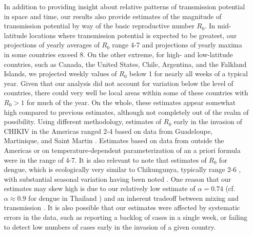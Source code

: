 \documentclass[11pt]{article}
\begin{document}
In addition to providing insight about relative patterns of transmission potential in space and time, our results also provide estimates of the magnitude of transmission potential by way of the basic reproductive number $R_0$. In mid-latitude locations where transmission potential is expected to be greatest, our projections of yearly averages of $R_0$ range 4-7 and projections of yearly maxima in some countries exceed 8. On the other extreme, for high- and low-latitude countries, such as Canada, the United States, Chile, Argentina, and the Falkland Islands, we projected weekly values of $R_0$ below 1 for nearly all weeks of a typical year. Given that our analysis did not account for variation below the level of countries, there could very well be local areas within some of these countries with $R_0>1$ for much of the year. On the whole, these estimates appear somewhat high compared to previous estimates, although not completely out of the realm of possibility. Using different methodology, estimates of $R_0$ early in the invasion of CHIKIV in the Americas ranged 2-4 based on data from Guadeloupe, Martinique, and Saint Martin \cite{Cauchemez2014}. Estimates based on data from outside the Americas \cite{Yakob2013,Robinson2014} or on temperature-dependent parameterization of an a priori formula \cite{Johansson2014} were in the range of 4-7. It is also relevant to note that estimates of $R_0$ for dengue, which is ecologically very similar to Chikungunya, typically range 2-6 \cite{Johansson2011}, with substantial seasonal variation having been noted \cite{Reiner2014}. One reason that our estimates may skew high is due to our relatively low estimate of $\alpha=0.74$ (cf. $\alpha\approx0.9$ for dengue in Thailand \cite{Reich2013}) and an inherent tradeoff between mixing and transmission \cite{Perkins2013}. It is also possible that our estimates were affected by systematic errors in the data, such as reporting a backlog of cases in a single week, or failing to detect low numbers of cases early in the invasion of a given country.
\end{document}
